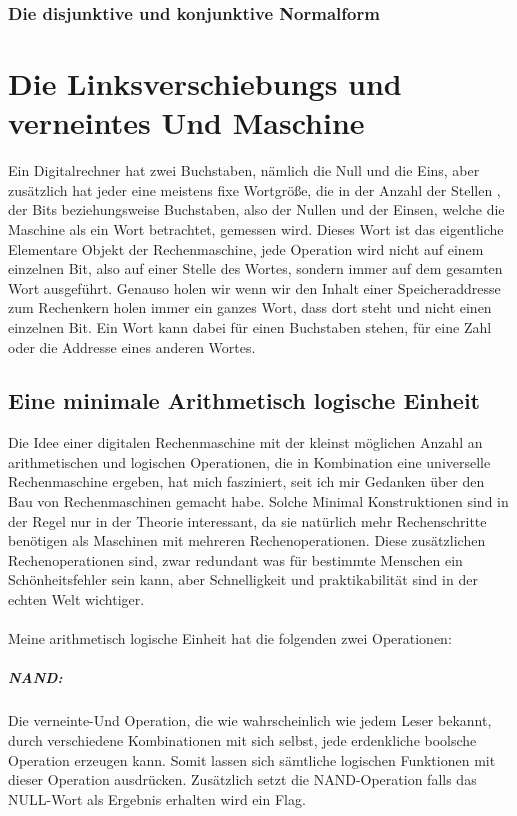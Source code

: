 \documentclass[11pt,a4paper,leqno]{report}
\numberwithin{equation}{chapter}
\begin{document}
\subsection{Die disjunktive und konjunktive Normalform}


\chapter{Die Linksverschiebungs und verneintes Und Maschine}
Ein Digitalrechner hat zwei Buchstaben, nämlich die Null und die Eins, aber zusätzlich hat jeder eine meistens fixe Wortgröße, die in der Anzahl der Stellen , der Bits beziehungsweise Buchstaben, also der Nullen und der Einsen, welche die Maschine als ein Wort betrachtet, gemessen wird. Dieses Wort ist das eigentliche Elementare Objekt der Rechenmaschine, jede Operation wird nicht auf einem einzelnen Bit, also auf einer Stelle des Wortes, sondern immer auf dem gesamten Wort ausgeführt. Genauso holen wir wenn wir den Inhalt einer Speicheraddresse zum Rechenkern holen immer ein ganzes Wort, dass dort steht und nicht einen einzelnen Bit.
Ein Wort kann dabei für einen Buchstaben stehen, für eine Zahl oder die Addresse eines anderen Wortes. 
\section{Eine minimale Arithmetisch logische Einheit}
Die Idee einer digitalen Rechenmaschine mit der kleinst möglichen Anzahl an arithmetischen und logischen Operationen, die in Kombination eine universelle Rechenmaschine ergeben, hat mich fasziniert, seit ich mir Gedanken über den Bau von Rechenmaschinen gemacht habe. Solche Minimal Konstruktionen sind in der Regel nur
in der Theorie interessant, da sie natürlich mehr Rechenschritte benötigen als Maschinen mit mehreren Rechenoperationen. Diese zusätzlichen Rechenoperationen sind, zwar redundant was für bestimmte Menschen ein Schönheitsfehler sein kann, aber Schnelligkeit und praktikabilität sind in der echten Welt wichtiger.\\
\\
Meine arithmetisch logische Einheit hat die folgenden zwei Operationen:
\paragraph{NAND: } Die verneinte-Und Operation, die wie wahrscheinlich wie jedem Leser bekannt, durch verschiedene Kombinationen mit sich selbst, jede erdenkliche boolsche Operation erzeugen kann. Somit lassen sich sämtliche logischen Funktionen mit dieser Operation ausdrücken. Zusätzlich setzt die NAND-Operation falls das NULL-Wort als Ergebnis erhalten wird ein Flag.
\end{document}
